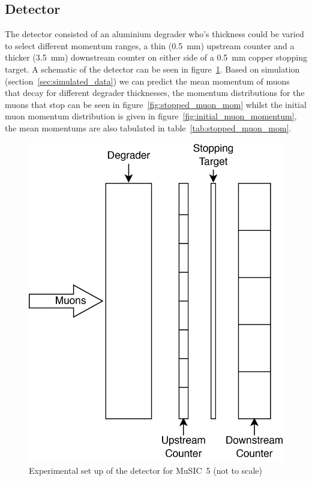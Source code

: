 \subsection{Detector} %
\label{sub:detector}
The detector consisted of an aluminium degrader who's thickness could be varied to select different momentum ranges, a thin (0.5~mm) upstream counter and a thicker (3.5~mm) downstream counter on either side of a 0.5~mm copper stopping target. A schematic of the detector can be seen in figure~\ref{fig:setup}. Based on simulation (section~\ref{sec:simulated_data}) we can predict the mean momentum of muons that decay for different degrader thicknesses, the momentum distributions for the muons that stop can be seen in figure~\ref{fig:stopped_muon_mom} whilst the initial muon momentum distribution is given in figure~\ref{fig:initial_muon_momentum}, the mean momentums are also tabulated in table~\ref{tab:stopped_muon_mom}.
\begin{figure}[htbp]
    \centering
        \includegraphics[scale=0.5]{images/Detector_setup.png}
    \caption{Experimental set up of the detector for MuSIC~5 (not to scale)}
    \label{fig:setup}
\end{figure}  
